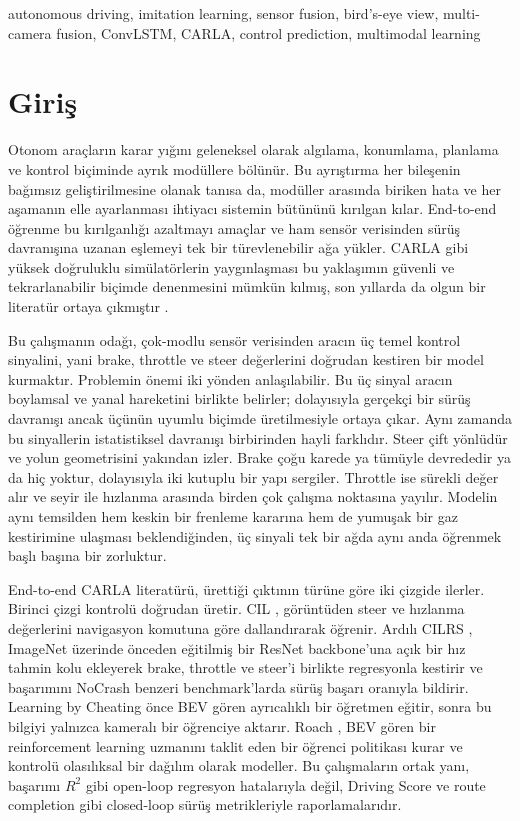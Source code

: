 \documentclass[conference]{IEEEtran}
\begin{document}
\begin{IEEEkeywords}
autonomous driving, imitation learning, sensor fusion, bird's-eye view, multi-camera fusion, ConvLSTM, CARLA, control prediction, multimodal learning
\end{IEEEkeywords}

\section{Giriş}

Otonom araçların karar yığını geleneksel olarak algılama, konumlama, planlama ve kontrol biçiminde ayrık modüllere bölünür. Bu ayrıştırma her bileşenin bağımsız geliştirilmesine olanak tanısa da, modüller arasında biriken hata ve her aşamanın elle ayarlanması ihtiyacı sistemin bütününü kırılgan kılar. End-to-end öğrenme bu kırılganlığı azaltmayı amaçlar ve ham sensör verisinden sürüş davranışına uzanan eşlemeyi tek bir türevlenebilir ağa yükler. CARLA \cite{Dosovitskiy17} gibi yüksek doğruluklu simülatörlerin yaygınlaşması bu yaklaşımın güvenli ve tekrarlanabilir biçimde denenmesini mümkün kılmış, son yıllarda da olgun bir literatür ortaya çıkmıştır \cite{Chen24Survey}.

Bu çalışmanın odağı, çok-modlu sensör verisinden aracın üç temel kontrol sinyalini, yani brake, throttle ve steer değerlerini doğrudan kestiren bir model kurmaktır. Problemin önemi iki yönden anlaşılabilir. Bu üç sinyal aracın boylamsal ve yanal hareketini birlikte belirler; dolayısıyla gerçekçi bir sürüş davranışı ancak üçünün uyumlu biçimde üretilmesiyle ortaya çıkar. Aynı zamanda bu sinyallerin istatistiksel davranışı birbirinden hayli farklıdır. Steer çift yönlüdür ve yolun geometrisini yakından izler. Brake çoğu karede ya tümüyle devrededir ya da hiç yoktur, dolayısıyla iki kutuplu bir yapı sergiler. Throttle ise sürekli değer alır ve seyir ile hızlanma arasında birden çok çalışma noktasına yayılır. Modelin aynı temsilden hem keskin bir frenleme kararına hem de yumuşak bir gaz kestirimine ulaşması beklendiğinden, üç sinyali tek bir ağda aynı anda öğrenmek başlı başına bir zorluktur.

End-to-end CARLA literatürü, ürettiği çıktının türüne göre iki çizgide ilerler. Birinci çizgi kontrolü doğrudan üretir. CIL \cite{Codevilla18}, görüntüden steer ve hızlanma değerlerini navigasyon komutuna göre dallandırarak öğrenir. Ardılı CILRS \cite{Codevilla19}, ImageNet üzerinde önceden eğitilmiş bir ResNet \cite{He16ResNet} backbone'una açık bir hız tahmin kolu ekleyerek brake, throttle ve steer'i birlikte regresyonla kestirir ve başarımını NoCrash benzeri benchmark'larda sürüş başarı oranıyla bildirir. Learning by Cheating \cite{Chen19LBC} önce BEV gören ayrıcalıklı bir öğretmen eğitir, sonra bu bilgiyi yalnızca kameralı bir öğrenciye aktarır. Roach \cite{Zhang21Roach}, BEV gören bir reinforcement learning uzmanını taklit eden bir öğrenci politikası kurar ve kontrolü olasılıksal bir dağılım olarak modeller. Bu çalışmaların ortak yanı, başarımı $R^2$ gibi open-loop regresyon hatalarıyla değil, Driving Score ve route completion gibi closed-loop sürüş metrikleriyle raporlamalarıdır.
\end{document}
